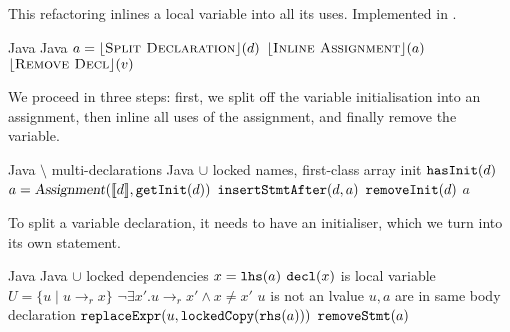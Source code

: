 \subsection{}
This refactoring inlines a local variable into all its uses. Implemented in .

\begin{algorithm}
\caption{$\refactoring{Inline Temp}(d : \type{LocalVarDecl})$}
\begin{algorithmic}[1]
\REQUIRE Java
\ENSURE Java
\medskip
\STATE $a = \lfloor\textsc{Split Declaration}\rfloor(d)$
\STATE $\lfloor\textsc{Inline Assignment}\rfloor(a)$
\STATE $\lfloor\textsc{Remove Decl}\rfloor(v)$
\end{algorithmic}
\end{algorithm}

We proceed in three steps: first, we split off the variable initialisation into an assignment, then inline all uses of the assignment, and finally remove the variable.

\begin{algorithm}
\caption{$\refactoring{Split Declaration}(d : \type{LocalVarDecl}) : \type{Assignment}$}
\begin{algorithmic}[1]
\REQUIRE Java $\setminus$ multi-declarations
\ENSURE Java $\cup$ locked names, first-class array init
\medskip
\STATE \assert $\text{\texttt{hasInit}}(d)$
\STATE $a = \text{\textsl{Assignment}}(\llbracket d\rrbracket, \text{\texttt{getInit}}(d))$  
\STATE $\text{\texttt{insertStmtAfter}}(d, a)$
\STATE $\text{\texttt{removeInit}}(d)$
\RETURN $a$
\end{algorithmic}
\end{algorithm}

To split a variable declaration, it needs to have an initialiser, which we turn into its own statement.

\begin{algorithm}
\caption{$\refactoring{Inline Assignment}(a : \type{Assignment})$}
\begin{algorithmic}[1]
\REQUIRE Java
\ENSURE Java $\cup$ locked dependencies
\medskip
\STATE $x = \text{\texttt{lhs}}(a)$
\STATE \assert $\text{\texttt{decl}}(x)$ is local variable
\STATE $U = \{ u \mid u\rightarrow_r x\}$
  \STATE \assert $\neg\exists x'.u\rightarrow_r x' \wedge x\neq x'$
  \STATE \assert $u$ is not an lvalue
  \STATE \assert $u,a$ are in same body declaration
  \STATE $\text{\texttt{replaceExpr}}(u, \text{\texttt{lockedCopy}}(\text{\texttt{rhs}}(a)))$
\ENDFOR
{}
  \STATE $\text{\texttt{removeStmt}}(a)$
\ENDIF
\end{algorithmic}
\end{algorithm}

